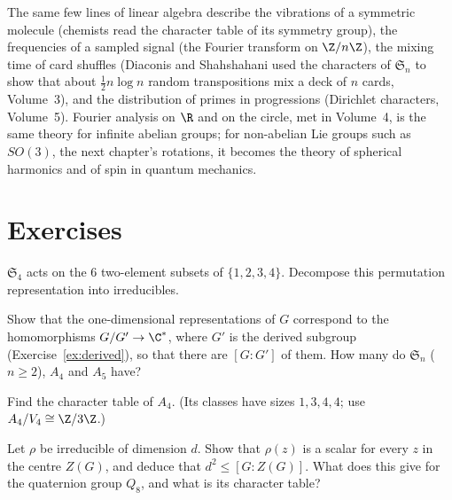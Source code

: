 \begin{beauty}
The same few lines of linear algebra describe the vibrations of a symmetric molecule (chemists read the character table of its symmetry group), the frequencies of a sampled signal (the Fourier transform on $\Z/n\Z$), the mixing time of card shuffles (Diaconis and Shahshahani used the characters of $\mathfrak S_n$ to show that about $\frac12n\log n$ random transpositions mix a deck of $n$ cards, Volume~3), and the distribution of primes in progressions (Dirichlet characters, Volume~5). Fourier analysis on $\R$ and on the circle, met in Volume~4, is the same theory for infinite abelian groups; for non-abelian Lie groups such as $SO(3)$, the next chapter's rotations, it becomes the theory of spherical harmonics and of spin in quantum mechanics.
\end{beauty}

\section{Exercises}

\begin{exercise}[$\star$]\label{ex:pairs}
$\mathfrak S_4$ acts on the $6$ two-element subsets of $\{1,2,3,4\}$. Decompose this permutation representation into irreducibles.
\end{exercise}

\begin{exercise}[$\star$]\label{ex:onedim}
Show that the one-dimensional representations of $G$ correspond to the homomorphisms $G/G'\to\C^*$, where $G'$ is the derived subgroup (Exercise~\ref{ex:derived}), so that there are $[G:G']$ of them. How many do $\mathfrak S_n$ ($n\ge2$), $A_4$ and $A_5$ have?
\end{exercise}

\begin{exercise}[$\star\star$]\label{ex:a4}
Find the character table of $A_4$. (Its classes have sizes $1,3,4,4$; use $A_4/V_4\cong\Z/3\Z$.)
\end{exercise}

\begin{exercise}[$\star\star$]\label{ex:centralchar}
Let $\rho$ be irreducible of dimension $d$. Show that $\rho(z)$ is a scalar for every $z$ in the centre $Z(G)$, and deduce that $d^2\le[G:Z(G)]$. What does this give for the quaternion group $Q_8$, and what is its character table?
\end{exercise}


